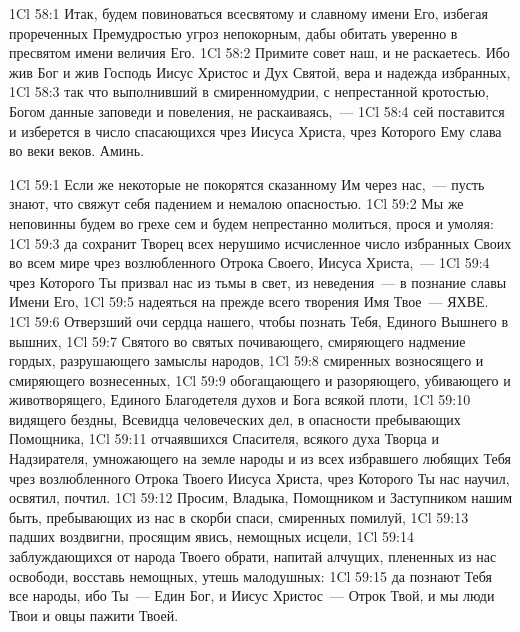 \vs 1Cl 58:1
Итак, будем повиноваться
всесвятому и славному имени Его, избегая прореченных Премудростью угроз
непокорным, дабы обитать уверенно в пресвятом имени величия Его.
\vs 1Cl 58:2
Примите совет наш, и не
раскаетесь. Ибо жив Бог и жив Господь Иисус Христос и Дух Святой, вера и
надежда избранных,
\vs 1Cl 58:3
так что выполнивший в
смиренномудрии, с непрестанной кротостью, Богом данные заповеди и повеления,
не раскаиваясь,~---
\vs 1Cl 58:4
сей поставится и изберется
в число спасающихся чрез Иисуса Христа, чрез Которого Ему слава во веки веков.
Аминь.

\vs 1Cl 59:1
Если же некоторые не
покорятся сказанному Им через нас,~--- пусть знают, что свяжут себя падением и
немалою опасностью.
\vs 1Cl 59:2
Мы же неповинны будем во
грехе сем и будем непрестанно молиться, прося и умоляя:
\vs 1Cl 59:3
да сохранит Творец всех
нерушимо исчисленное число избранных Своих во всем мире чрез возлюбленного
Отрока Своего, Иисуса Христа,~---
\vs 1Cl 59:4
чрез Которого Ты призвал
нас из тьмы в свет, из неведения~--- в познание славы Имени Его,
\vs 1Cl 59:5
надеяться на прежде всего
творения Имя Твое~--- ЯХВЕ.
\vs 1Cl 59:6
Отверзший очи сердца
нашего, чтобы познать Тебя, Единого Вышнего в вышних,
\vs 1Cl 59:7
Святого во святых
почивающего, смиряющего надмение гордых, разрушающего замыслы народов,
\vs 1Cl 59:8
смиренных возносящего и
смиряющего вознесенных,
\vs 1Cl 59:9
обогащающего и
разоряющего, убивающего и животворящего, Единого Благодетеля духов и Бога
всякой плоти,
\vs 1Cl 59:10
видящего бездны, Всевидца
человеческих дел, в опасности пребывающих Помощника,
\vs 1Cl 59:11
отчаявшихся Спасителя,
всякого духа Творца и Надзирателя, умножающего на земле народы и из всех
избравшего любящих Тебя чрез возлюбленного Отрока Твоего Иисуса Христа, чрез
Которого Ты нас научил, освятил, почтил.
\vs 1Cl 59:12
Просим, Владыка,
Помощником и Заступником нашим быть, пребывающих из нас в скорби спаси,
смиренных помилуй,
\vs 1Cl 59:13
падших воздвигни,
просящим явись, немощных исцели,
\vs 1Cl 59:14
заблуждающихся от народа
Твоего обрати, напитай алчущих, плененных из нас освободи, восставь немощных,
утешь малодушных:
\vs 1Cl 59:15
да познают Тебя все
народы, ибо Ты~--- Един Бог, и Иисус Христос~--- Отрок Твой, и мы люди Твои и
овцы пажити Твоей.

